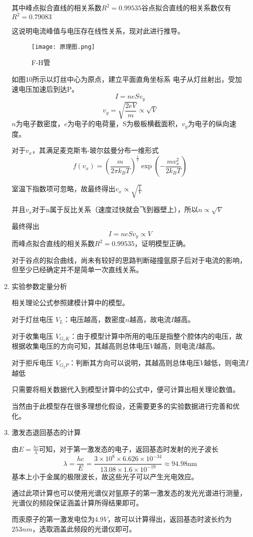 \documentclass[dvipsnames, svgnames,a4paper,11pt]{article}
\begin{document}
\begin{enumerate}
		其中峰点拟合直线的相关系数$R^2=0.99535$\quad 谷点拟合直线的相关系数仅有$R^2=0.79083$

		这说明电流峰值与电压存在线性关系，现对此进行推导。

		\begin{figure}[{H}]
			\centering
			\texttt{[image: 原理图.png]}
			\caption{F-H管}
			\label{}
		\end{figure}
		如图10所示以灯丝中心为原点，建立平面直角坐标系
		电子从灯丝射出，受加速电压加速后到达P。
		$$I=neSv_y$$
		$$v_y=\sqrt{\frac{2eV}m}\propto\sqrt{V}$$
		$n$为电子数密度，$e$为电子的电荷量，S为极板横截面积，$v_y$为电子的纵向速度。

		对于$v_x$，其满足麦克斯韦-玻尔兹曼分布一维形式
		$$f(v_x)=\left(\frac m{2\pi k_BT}\right)^{\frac12}\exp\left(-\frac{mv_x^2}{2k_BT}\right)$$
		
		室温下指数项可忽略，故最终得出$v_x\propto\sqrt{\frac1V}$

        并且$v_x$对于n属于反比关系（速度过快就会飞到器壁上），所以$n\propto\sqrt{V}$
        
		最终得出
		$$I=neSv_y\propto V$$
       而峰点拟合直线的相关系数$R^2=0.99535$，证明模型正确。

	   对于谷点的拟合曲线，尚未有较好的思路判断碰撞氩原子后对于电流的影响，但至少已经确定并不是简单一次直线关系。

	   \item 实验参数定量分析
	   
	   相关理论公式参照建模计算中的模型。

	   对于灯丝电压 $V_L$：电压越高，数密度$n$越高，故电流$I$越高。

	   对于收集电压 $V_{G_1K}$：由于模型计算中所用的电压是指整个腔体内的电压，故根据收集电压的方向可知，其越高则总体电压$V$越高，则电流$I$越高。

	   对于拒斥电压 $V_{G_2P}$：判断其方向可以说明，其越高则总体电压$V$越低，则电流$I$越低

	   只需要将相关数据代入到模型计算中的公式中，便可计算出相关理论数值。
	   
	   当然由于此模型存在很多理想化假设，还需要更多的实验数据进行完善和优化。



	   
	   \item 激发态退回基态的计算
	   
	   由$E=\frac{hc}\lambda$可知，对于第一激发态的电子，返回基态时发射的光子波长
$$\lambda=\frac{hc}{E}=\frac{3\times10^8\times6.626\times10^{-34}}{13.08\times1.6\times10^{-19}}\approx94.98\mathrm{nm}$$
基本上小于金属的极限波长，故这些光子可以产生光电效应。

通过此项计算也可以使用光谱仪对氩原子的第一激发态的发光光谱进行测量，光谱仪的频段保证涵盖计算所得结果即可。

而汞原子的第一激发电位为$4.9V$，故可以计算得出，返回基态时波长约为$253nm$，选取涵盖此频段的光谱仪即可。
		
	\end{enumerate}
\end{document}
